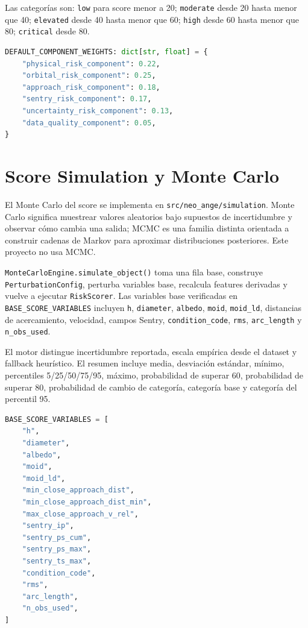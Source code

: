 \documentclass[12pt,a4paper]{report}
\newcommand{\code}[1]{\texttt{#1}}
\DeclareRobustCommand{\filepath}[1]{\nolinkurl{#1}}
\begin{document}
Las categorías son: \code{low} para score menor a 20; \code{moderate} desde 20 hasta menor que 40; \code{elevated} desde 40 hasta menor que 60; \code{high} desde 60 hasta menor que 80; \code{critical} desde 80.

\begin{lstlisting}[language=Python,caption={Pesos exactos del score}]
DEFAULT_COMPONENT_WEIGHTS: dict[str, float] = {
    "physical_risk_component": 0.22,
    "orbital_risk_component": 0.25,
    "approach_risk_component": 0.18,
    "sentry_risk_component": 0.17,
    "uncertainty_risk_component": 0.13,
    "data_quality_component": 0.05,
}
\end{lstlisting}

\chapter{Score Simulation y Monte Carlo}

El Monte Carlo del score se implementa en \filepath{src/neo_ange/simulation}. Monte Carlo significa muestrear valores aleatorios bajo supuestos de incertidumbre y observar cómo cambia una salida; MCMC es una familia distinta orientada a construir cadenas de Markov para aproximar distribuciones posteriores. Este proyecto no usa MCMC.

\code{MonteCarloEngine.simulate\_object()} toma una fila base, construye \code{PerturbationConfig}, perturba variables base, recalcula features derivadas y vuelve a ejecutar \code{RiskScorer}. Las variables base verificadas en \code{BASE\_SCORE\_VARIABLES} incluyen \code{h}, \code{diameter}, \code{albedo}, \code{moid}, \code{moid\_ld}, distancias de acercamiento, velocidad, campos Sentry, \code{condition\_code}, \code{rms}, \code{arc\_length} y \code{n\_obs\_used}.

El motor distingue incertidumbre reportada, escala empírica desde el dataset y fallback heurístico. El resumen incluye media, desviación estándar, mínimo, percentiles 5/25/50/75/95, máximo, probabilidad de superar 60, probabilidad de superar 80, probabilidad de cambio de categoría, categoría base y categoría del percentil 95.

\begin{lstlisting}[language=Python,caption={Variables base de incertidumbre}]
BASE_SCORE_VARIABLES = [
    "h",
    "diameter",
    "albedo",
    "moid",
    "moid_ld",
    "min_close_approach_dist",
    "min_close_approach_dist_min",
    "max_close_approach_v_rel",
    "sentry_ip",
    "sentry_ps_cum",
    "sentry_ps_max",
    "sentry_ts_max",
    "condition_code",
    "rms",
    "arc_length",
    "n_obs_used",
]
\end{lstlisting}
\end{document}
